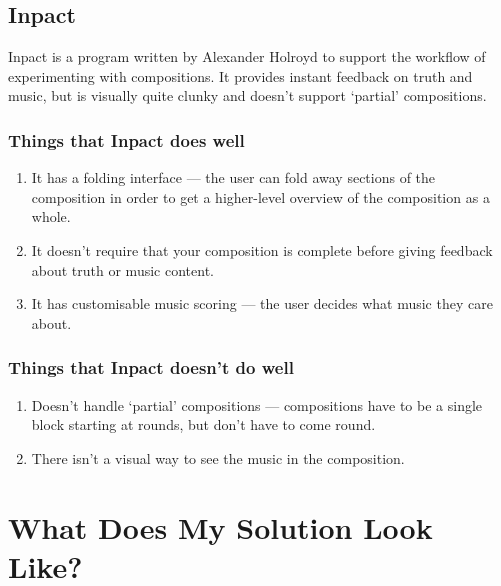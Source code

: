 \documentclass[12pt]{article}
\begin{document}
\subsection{Inpact}

Inpact is a program written by Alexander Holroyd to support the workflow of experimenting with
compositions.  It provides instant feedback on truth and music, but is visually quite clunky and
doesn't support `partial' compositions.

\subsubsection{Things that Inpact does well}

\begin{enumerate}
    \item It has a folding interface --- the user can fold away sections of the composition in order
        to get a higher-level overview of the composition as a whole.
    \item It doesn't require that your composition is complete before giving feedback about truth or
        music content.
    \item It has customisable music scoring --- the user decides what music they care about.
\end{enumerate}

\subsubsection{Things that Inpact doesn't do well}

\begin{enumerate}
    \item Doesn't handle `partial' compositions --- compositions have to be a single block starting
        at rounds, but don't have to come round.
    \item There isn't a visual way to see the music in the composition.
\end{enumerate}

\section{What Does My Solution Look Like?}
\end{document}
